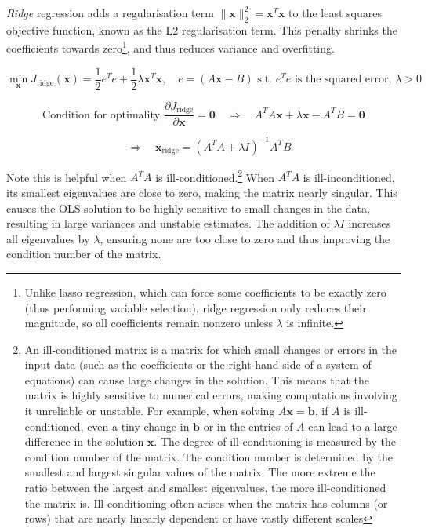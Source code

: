 \textit{Ridge} regression adds a regularisation term
$\lVert \bm{x} \rVert _2^2 = \bm{x}^T \bm{x}$
to the least squares objective function, known as the L2 regularisation term.
This penalty shrinks the coefficients towards zero\footnote{
    Unlike lasso regression, which can force some coefficients to be exactly zero (thus performing variable selection),
    ridge regression only reduces their magnitude, so all coefficients remain nonzero unless $\lambda$ is infinite.
}, and thus reduces variance and overfitting.

$$
\min_{\bm{x}}{J_\text{ridge}(\bm{x})} = \frac{1}{2} e^T e + \frac{1}{2} \lambda \bm{x}^T \bm{x},
\quad e = (A\bm{x} - B) \text{ s.t. } e^T e \text{ is the squared error}, \, \lambda > 0
$$

$$
\text{Condition for optimality } \frac{\partial J_\text{ridge}}{\partial \bm{x}} = \bm{0}
\quad \Rightarrow \quad
A^T A \bm{x} + \lambda \bm{x} - A^T B = \bm{0}
$$

$$
\quad \Rightarrow \quad
\bm{x}_\text{ridge} = (A^T A + \lambda I)^{-1} A^T B
$$

Note this is helpful when $A^TA$ is ill-conditioned.\footnote{
    An ill-conditioned matrix is a matrix for which
    small changes or errors in the input data
    (such as the coefficients or the right-hand side of a system of equations)
    can cause large changes in the solution.
    This means that the matrix is highly sensitive to numerical errors,
    making computations involving it unreliable or unstable.
    For example, when solving $A\bm{x} = \bm{b}$, if $A$ is ill-conditioned,
    even a tiny change in $\bm{b}$ or in the entries of $A$ can lead to a large difference in the solution $\bm{x}$.
    The degree of ill-conditioning is measured by the condition number of the matrix.
    The condition number is determined by the smallest and largest singular values of the matrix.
    The more extreme the ratio between the largest and smallest eigenvalues, the more ill-conditioned the matrix is.
    Ill-conditioning often arises when the matrix has columns (or rows) that are nearly linearly dependent or have vastly different scales
} When $A^T A$ is ill-inconditioned, its smallest eigenvalues are close to zero,
making the matrix nearly singular. This causes the OLS solution to be highly sensitive to small changes in the data,
resulting in large variances and unstable estimates.
The addition of $\lambda I$ increases all eigenvalues by $\lambda$,
ensuring none are too close to zero and thus improving the condition number of the matrix.

